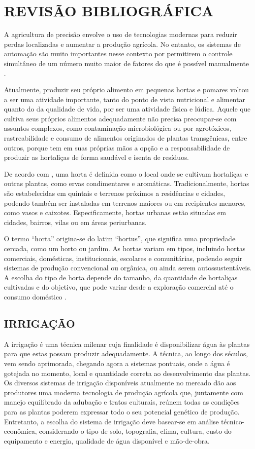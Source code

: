 \documentclass[%
  article,%
  a4paper,%
  12pt,%
  fleqn,%
  oneside,%
  chapter = TITLE,%
  section = TITLE,%
]{abntex2}
\begin{document}
\section{REVISÃO BIBLIOGRÁFICA}\label{ssec:teor}

A agricultura de precisão envolve o uso de tecnologias modernas para reduzir perdas localizadas e aumentar a produção agrícola. No entanto, os sistemas de automação são muito importantes nesse contexto por permitirem o controle simultâneo de um número muito maior de fatores do que é possível manualmente \cite{coelho2009agricultura}.

Atualmente, produzir seu próprio alimento em pequenas hortas e pomares voltou a ser uma atividade importante, tanto do ponto de vista nutricional e alimentar quanto do da qualidade de vida, por ser uma atividade física e lúdica. Aquele que cultiva seus próprios alimentos adequadamente não precisa preocupar-se com assuntos complexos, como contaminação microbiológica ou por agrotóxicos, rastreabilidade e consumo de alimentos originados de plantas transgênicas, entre outros, porque tem em suas próprias mãos a opção e a responsabilidade de produzir as hortaliças de forma saudável e isenta de resíduos.

De acordo com \citet{HenzAlcantara2009v2}, uma horta é definida como o local onde se cultivam hortaliças e outras plantas, como ervas condimentares e aromáticas. Tradicionalmente, hortas são estabelecidas em quintais e terrenos próximos a residências e cidades, podendo também ser instaladas em terrenos maiores ou em recipientes menores, como vasos e caixotes. Especificamente, hortas urbanas estão situadas em cidades, bairros, vilas ou em áreas periurbanas.

O termo “horta” origina-se do latim “hortus”, que significa uma propriedade cercada, como um horto ou jardim. As hortas variam em tipos, incluindo hortas comerciais, domésticas, institucionais, escolares e comunitárias, podendo seguir sistemas de produção convencional ou orgânica, ou ainda serem autossustentáveis. A escolha do tipo de horta depende do tamanho, da quantidade de hortaliças cultivadas e do objetivo, que pode variar desde a exploração comercial até o consumo doméstico \cite{HenzAlcantara2009v2}.

\subsection{IRRIGAÇÃO}
A irrigação é uma técnica milenar cuja finalidade é disponibilizar água às plantas para que estas possam produzir adequadamente. A técnica, ao longo dos séculos, vem sendo aprimorada, chegando agora a sistemas pontuais, onde a água é gotejada no momento, local e quantidade correta ao desenvolvimento das plantas. Os diversos sistemas de irrigação disponíveis atualmente no mercado dão aos produtores uma moderna tecnologia de produção agrícola que, juntamente com manejo equilibrado da adubação e tratos culturais, reúnem todas as condições para as plantas poderem expressar todo o seu potencial genético de produção. Entretanto, a escolha do sistema de irrigação deve basear-se em análise técnico-econômica, considerando o tipo de solo, topografia, clima, cultura, custo do equipamento e energia, qualidade de água disponível e mão-de-obra.
\end{document}
